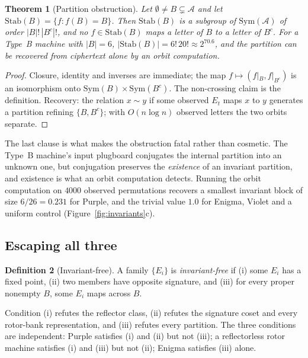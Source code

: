 \documentclass[11pt]{article}
\newtheorem{theorem}{Theorem}
\theoremstyle{definition}
\newtheorem{definition}[theorem]{Definition}
\newcommand{\Sym}{\mathrm{Sym}}
\begin{document}
\begin{theorem}[Partition obstruction]\label{thm:partition}
Let $\emptyset \neq B \subsetneq \mathcal{A}$ and let $\mathrm{Stab}(B) = \{f :
f(B) = B\}$. Then $\mathrm{Stab}(B)$ is a subgroup of $\Sym(\mathcal{A})$ of
order $|B|!\,|B^{c}|!$, and no $f \in \mathrm{Stab}(B)$ maps a letter of $B$ to a
letter of $B^{c}$. For a Type~B machine with $|B| = 6$, $|\mathrm{Stab}(B)| =
6!\,20! \approx 2^{70.6}$, and the partition can be recovered from ciphertext
alone by an orbit computation.
\end{theorem}

\begin{proof}
Closure, identity and inverses are immediate; the map $f \mapsto
(f|_B, f|_{B^c})$ is an isomorphism onto $\Sym(B)\times\Sym(B^{c})$. The
non-crossing claim is the definition. Recovery: the relation $x \sim y$ if some
observed $E_t$ maps $x$ to $y$ generates a partition refining $\{B, B^c\}$; with
$O(n \log n)$ observed letters the two orbits separate.
\end{proof}

The last clause is what makes the obstruction fatal rather than cosmetic. The
Type~B machine's input plugboard conjugates the internal partition into an
unknown one, but conjugation preserves the \emph{existence} of an invariant
partition, and existence is what an orbit computation detects. Running the orbit
computation on $4000$ observed permutations recovers a smallest invariant block
of size $6/26 = 0.231$ for Purple, and the trivial value $1.0$ for Enigma,
Violet and a uniform control (Figure~\ref{fig:invariants}c).

\subsection{Escaping all three}

\begin{definition}[Invariant-free]\label{def:invfree}
A family $\{E_i\}$ is \emph{invariant-free} if (i) some $E_i$ has a fixed point,
(ii) two members have opposite signature, and (iii) for every proper nonempty
$B$, some $E_i$ maps across $B$.
\end{definition}

Condition (i) refutes the reflector class, (ii) refutes the signature coset and
every rotor-bank representation, and (iii) refutes every partition. The three
conditions are independent: Purple satisfies (i) and (ii) but not (iii); a
reflectorless rotor machine satisfies (i) and (iii) but not (ii); Enigma
satisfies (iii) alone.
\end{document}
